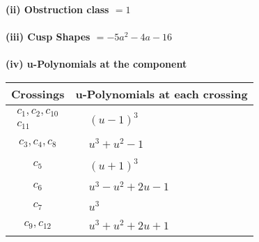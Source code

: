\documentclass[1p]{elsarticle_modified}
\theoremstyle{definition}
\begin{document}
\flushleft \textbf{(ii) Obstruction class $= 1$}\\~\\
\flushleft \textbf{(iii) Cusp Shapes $= -5 a^2-4 a-16$}\\~\\
\newpage\renewcommand{\arraystretch}{1}
\flushleft \textbf{(iv) u-Polynomials at the component}\newline \\
\begin{tabular}{m{50pt}|m{274pt}}
Crossings & \hspace{64pt}u-Polynomials at each crossing \\
\hline $$\begin{aligned}c_{1},c_{2},c_{10}\\c_{11}\end{aligned}$$&$\begin{aligned}
&(u-1)^3
\end{aligned}$\\
\hline $$\begin{aligned}c_{3},c_{4},c_{8}\end{aligned}$$&$\begin{aligned}
&u^3+u^2-1
\end{aligned}$\\
\hline $$\begin{aligned}c_{5}\end{aligned}$$&$\begin{aligned}
&(u+1)^3
\end{aligned}$\\
\hline $$\begin{aligned}c_{6}\end{aligned}$$&$\begin{aligned}
&u^3- u^2+2 u-1
\end{aligned}$\\
\hline $$\begin{aligned}c_{7}\end{aligned}$$&$\begin{aligned}
&u^3
\end{aligned}$\\
\hline $$\begin{aligned}c_{9},c_{12}\end{aligned}$$&$\begin{aligned}
&u^3+u^2+2 u+1
\end{aligned}$\\
\hline
\end{tabular}\\~\\
\end{document}
